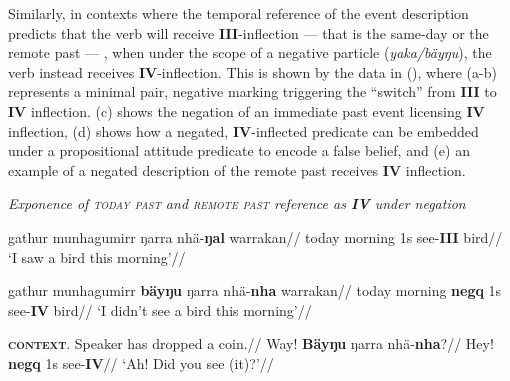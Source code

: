 Similarly, in contexts where the temporal reference of the event description predicts that the verb will receive \textbf{III}-inflection --- that is the same-day or the remote past --- , when under the scope of a negative particle (\textit{yaka/bäyŋu}), the verb instead receives \textbf{IV}-inflection. This is shown by the data in (), where (a-b) represents a minimal pair, negative marking triggering the ``switch'' from \textbf{III} to \textbf{IV} inflection. (c) shows the negation of an immediate past event licensing \textbf{IV} inflection, (d) shows how a negated, \textbf{IV}-inflected predicate can be embedded under a propositional attitude predicate to encode a false belief, and (e) an example of a negated description of the remote past receives \textbf{IV} inflection.

\pex \textit{Exponence of \textsc{today past} and \textsc{remote past} reference as \textbf{IV} under negation}



\a\begingl\gla gathur munhagumirr ŋarra nhä-\textbf{ŋal} warrakan//
\glb today morning 1s see-\textbf{III} bird//
\glft`I saw a bird this morning'\trailingcitation{[FW 20180802]}//\endgl


\a\begingl\gla gathur munhagumirr \textbf{bäyŋu} ŋarra nhä-\textbf{nha} warrakan//
\glb today morning \textbf{\gls{negq}} 1s see-\textbf{IV} bird//
\glft`I didn't see a bird this morning'\trailingcitation{[FW 20180802]}//\endgl

\a\begingl\glpreamble \textsc{\textbf{context}.} Speaker has dropped a coin.//
\gla Way! \textbf{Bäyŋu} ŋarra nhä-\textbf{nha}?//
\glb Hey! \textbf{\gls{negq}} 1s see-\textbf{IV}//
\glft`Ah! Did you see (it)?'\trailingcitation{[AW 20180830]}//\endgl


